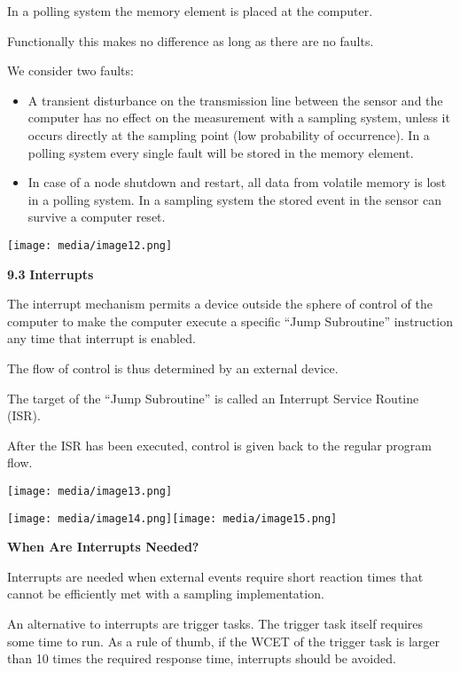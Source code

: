 In a polling system the memory element is placed at the computer.

Functionally this makes no difference as long as there are no faults.

We consider two faults:

\begin{itemize}
\item
  A transient disturbance on the transmission line between the sensor
  and the computer has no effect on the measurement with a sampling
  system, unless it occurs directly at the sampling point (low
  probability of occurrence). In a polling system every single fault
  will be stored in the memory element.
\item
  In case of a node shutdown and restart, all data from volatile memory
  is lost in a polling system. In a sampling system the stored event in
  the sensor can survive a computer reset.
\end{itemize}

\texttt{[image: media/image12.png]}

\textbf{9.3} \protect\hypertarget{teil4}{}{}\textbf{Interrupts }

The interrupt mechanism permits a device outside the sphere of control
of the computer to make the computer execute a specific ``Jump
Subroutine'' instruction any time that interrupt is enabled.

The flow of control is thus determined by an external device.

The target of the ``Jump Subroutine'' is called an Interrupt Service
Routine (ISR).

After the ISR has been executed, control is given back to the regular
program flow.

\texttt{[image: media/image13.png]}

\texttt{[image: media/image14.png]}\texttt{[image: media/image15.png]}

\textbf{When Are Interrupts Needed?}

Interrupts are needed when external events require short reaction times
that cannot be efficiently met with a sampling implementation.

An alternative to interrupts are trigger tasks. The trigger task itself
requires some time to run. As a rule of thumb, if the WCET of the
trigger task is larger than 10 times the required response time,
interrupts should be avoided.

